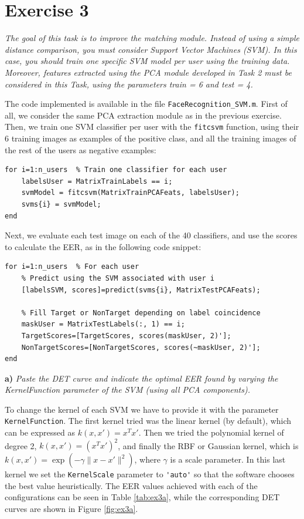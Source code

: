 \documentclass[11pt]{article}
\begin{document}
\section*{Exercise 3}

\textit{The goal of this task is to improve the matching module. Instead of using a simple distance comparison, you must consider Support Vector Machines (SVM). In this case, you should train one specific SVM model per user using the training data. Moreover, features extracted using the PCA module developed in Task 2 must be considered in this Task, using the parameters train = 6 and test = 4.}

The code implemented is available in the file \verb|FaceRecognition_SVM.m|. First of all, we consider the same PCA extraction module as in the previous exercise. Then, we train one SVM classifier per user with the \verb|fitcsvm| function, using their 6 training images as examples of the positive class, and all the training images of the rest of the users as negative examples:

\begin{verbatim}
for i=1:n_users  % Train one classifier for each user
    labelsUser = MatrixTrainLabels == i;
    svmModel = fitcsvm(MatrixTrainPCAFeats, labelsUser);
    svms{i} = svmModel;
end
\end{verbatim}

Next, we evaluate each test image on each of the 40 classifiers, and use the scores to calculate the EER, as in the following code snippet:

\begin{verbatim}
for i=1:n_users  % For each user
    % Predict using the SVM associated with user i
    [labelsSVM, scores]=predict(svms{i}, MatrixTestPCAFeats);

    % Fill Target or NonTarget depending on label coincidence
    maskUser = MatrixTestLabels(:, 1) == i;
    TargetScores=[TargetScores, scores(maskUser, 2)'];
    NonTargetScores=[NonTargetScores, scores(~maskUser, 2)'];
end
\end{verbatim}


\textbf{a)} \emph{Paste the DET curve and indicate the optimal EER found by varying the KernelFunction parameter of the SVM (using all PCA components).}

To change the kernel of each SVM we have to provide it with the parameter \verb|KernelFunction|. The first kernel tried was the linear kernel (by default), which can be expressed as $k(x, x')=x^Tx'$. Then we tried the polynomial kernel of degree 2, $k(x, x')=(x^Tx')^2$, and finally the RBF or Gaussian kernel, which is $k(x, x')=\exp(-\gamma\lVert x - x'\rVert^2)$, where $\gamma$ is a scale parameter. In this last kernel we set the \verb|KernelScale| parameter to \verb|'auto'| so that the software chooses the best value heuristically. The EER values achieved with each of the configurations can be seen in Table \ref{tab:ex3a}, while the corresponding DET curves are shown in Figure \ref{fig:ex3a}.
\end{document}
